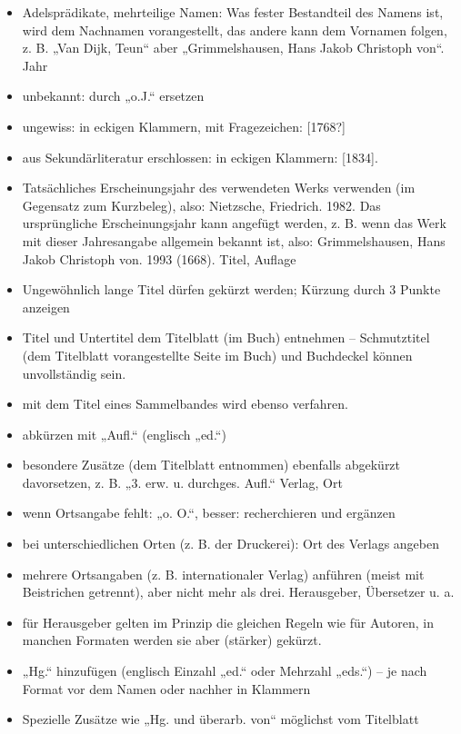 \documentclass[]{book}
\providecommand{\tightlist}{%
  \setlength{\itemsep}{0pt}\setlength{\parskip}{0pt}}
\theoremstyle{definition}
\theoremstyle{definition}
\theoremstyle{definition}
\theoremstyle{remark}
\begin{document}
\begin{itemize}
\tightlist
\item
  Adelsprädikate, mehrteilige Namen: Was fester Bestandteil des Namens
  ist, wird dem Nachnamen vorangestellt, das andere kann dem Vornamen
  folgen, z. B. „Van Dijk, Teun`` aber „Grimmelshausen, Hans Jakob
  Christoph von``. Jahr
\item
  unbekannt: durch „o.J.`` ersetzen
\item
  ungewiss: in eckigen Klammern, mit Fragezeichen: {[}1768?{]}
\item
  aus Sekundärliteratur erschlossen: in eckigen Klammern: {[}1834{]}.
\item
  Tatsächliches Erscheinungsjahr des verwendeten Werks verwenden (im
  Gegensatz zum Kurzbeleg), also: Nietzsche, Friedrich. 1982. Das
  ursprüngliche Erscheinungsjahr kann angefügt werden, z. B. wenn das
  Werk mit dieser Jahresangabe allgemein bekannt ist, also:
  Grimmelshausen, Hans Jakob Christoph von. 1993 (1668). Titel, Auflage
\item
  Ungewöhnlich lange Titel dürfen gekürzt werden; Kürzung durch 3 Punkte
  anzeigen
\item
  Titel und Untertitel dem Titelblatt (im Buch) entnehmen --
  Schmutztitel (dem Titelblatt vorangestellte Seite im Buch) und
  Buchdeckel können unvollständig sein.
\item
  mit dem Titel eines Sammelbandes wird ebenso verfahren.
\item
  abkürzen mit „Aufl.`` (englisch „ed.``)
\item
  besondere Zusätze (dem Titelblatt entnommen) ebenfalls abgekürzt
  davorsetzen, z. B. „3. erw. u. durchges. Aufl.`` Verlag, Ort
\item
  wenn Ortsangabe fehlt: „o. O.``, besser: recherchieren und ergänzen
\item
  bei unterschiedlichen Orten (z. B. der Druckerei): Ort des Verlags
  angeben
\item
  mehrere Ortsangaben (z. B. internationaler Verlag) anführen (meist mit
  Beistrichen getrennt), aber nicht mehr als drei. Herausgeber,
  Übersetzer u. a.
\item
  für Herausgeber gelten im Prinzip die gleichen Regeln wie für Autoren,
  in manchen Formaten werden sie aber (stärker) gekürzt.
\item
  „Hg.`` hinzufügen (englisch Einzahl „ed.`` oder Mehrzahl „eds.``) --
  je nach Format vor dem Namen oder nachher in Klammern
\item
  Spezielle Zusätze wie „Hg. und überarb. von`` möglichst vom Titelblatt

\end{itemize}
\end{document}
